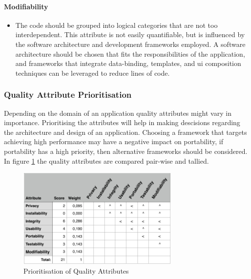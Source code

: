             \paragraph{Modifiability}

                \begin{itemize}[leftmargin=1.4cm]
                    \item[MOD-1 :] The code should be grouped into logical categories that are not too interdependent. This attribute is not easily quantifiable, but is influenced by the software architecture and development frameworks employed. A software architecture should be chosen that fits the responsibilities of the application, and frameworks that integrate data-binding, templates, and ui composition techniques can be leveraged to reduce lines of code.

                \end{itemize}


        \subsubsection{Quality Attribute Prioritisation}

            Depending on the domain of an application quality attributes might vary in importance. Prioritising the attributes will help in making descisions regarding the architecture and design of an application. Choosing a framework that targets achieving high performance may have a negative impact on portability, if portability has a high priority, then alternative frameworks should be considered. In figure \ref{fig:qa_prio} the quality attributes are compared pair-wise and tallied.

            \begin{figure}[H]
                \centering
                \includegraphics[width=8cm]{assets/requirements/QualityPrio.pdf}
                \caption{Prioritisation of Quality Attributes}
                \label{fig:qa_prio}
            \end{figure}




